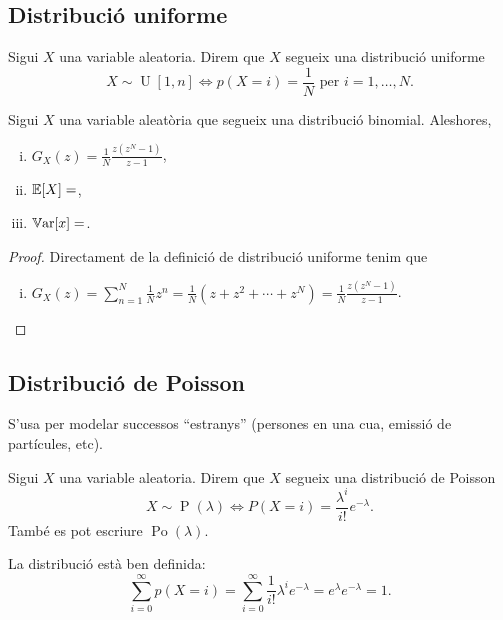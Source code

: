 \subsection*{Distribució uniforme}

\begin{defi}
    Sigui $X$ una variable aleatoria. Direm que $X$ segueix una distribució uniforme
    \[X \sim \operatorname{U}[1,n] \iff p(X=i)=\frac{1}{N} \text{ per } i = 1,\dots,N.\]
\end{defi}

\begin{prop}
    Sigui $X$ una variable aleatòria que segueix una distribució binomial. Aleshores,
    \begin{enumerate}[i)]
     \item $G_X(z) =  \frac{1}{N}\frac{z(z^N-1)}{z-1}$,
     \item $\operatorname{\mathbb{E}}[X]=$,
     \item $\operatorname{\mathbb{V}ar}[x]=$.
    \end{enumerate}
\end{prop}

\begin{proof}%
  Directament de la definició de distribució uniforme tenim que
  \begin{enumerate}[i)]
   \item $G_X(z) = \sum_{n=1}^N \frac{1}{N}z^n = \frac{1}{N}(z+z^2+\cdots+z^N) = \frac{1}{N}\frac{z(z^N-1)}{z-1}$.
  \end{enumerate}
\end{proof}


\subsection*{Distribució de Poisson}

S'usa per modelar successos ``estranys'' (persones en una cua, emissió de partícules, etc).

\begin{defi}
    Sigui $X$ una variable aleatoria. Direm que $X$ segueix una distribució de Poisson
    \[X \sim \operatorname{P}(\lambda) \iff P(X=i) = \frac{\lambda^i }{i!}e^{-\lambda}.\]
    També es pot escriure $\operatorname{Po}(\lambda)$.
\end{defi}

\begin{obs}
    La distribució està ben definida:
    \[\sum_{i=0}^\infty p(X=i) = \sum_{i=0}^\infty \frac{1}{i!}\lambda^i e^{-\lambda} = e^\lambda e^{-\lambda} = 1.\]
\end{obs}

